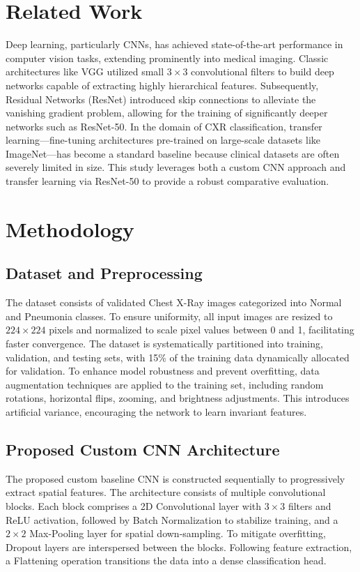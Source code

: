 \documentclass[conference]{IEEEtran}
\begin{document}
\section{Related Work}
Deep learning, particularly CNNs, has achieved state-of-the-art performance in computer vision tasks, extending prominently into medical imaging. Classic architectures like VGG utilized small $3 \times 3$ convolutional filters to build deep networks capable of extracting highly hierarchical features. Subsequently, Residual Networks (ResNet) introduced skip connections to alleviate the vanishing gradient problem, allowing for the training of significantly deeper networks such as ResNet-50. In the domain of CXR classification, transfer learning---fine-tuning architectures pre-trained on large-scale datasets like ImageNet---has become a standard baseline because clinical datasets are often severely limited in size. This study leverages both a custom CNN approach and transfer learning via ResNet-50 to provide a robust comparative evaluation.

\section{Methodology}

\subsection{Dataset and Preprocessing}
The dataset consists of validated Chest X-Ray images categorized into Normal and Pneumonia classes. To ensure uniformity, all input images are resized to $224 \times 224$ pixels and normalized to scale pixel values between 0 and 1, facilitating faster convergence. The dataset is systematically partitioned into training, validation, and testing sets, with 15\% of the training data dynamically allocated for validation. To enhance model robustness and prevent overfitting, data augmentation techniques are applied to the training set, including random rotations, horizontal flips, zooming, and brightness adjustments. This introduces artificial variance, encouraging the network to learn invariant features.

\subsection{Proposed Custom CNN Architecture}
The proposed custom baseline CNN is constructed sequentially to progressively extract spatial features. The architecture consists of multiple convolutional blocks. Each block comprises a 2D Convolutional layer with $3 \times 3$ filters and ReLU activation, followed by Batch Normalization to stabilize training, and a $2 \times 2$ Max-Pooling layer for spatial down-sampling. To mitigate overfitting, Dropout layers are interspersed between the blocks. Following feature extraction, a Flattening operation transitions the data into a dense classification head.
\end{document}
